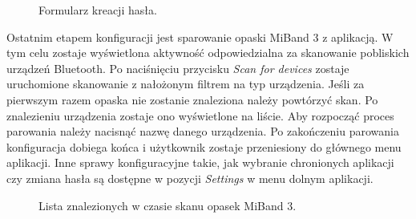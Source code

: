 \begin{figure}[H]
    \begin{center}
        \setlength{\fboxsep}{0pt}%
        \setlength{\fboxrule}{0.27pt}%
    \end{center}
    \caption{{\color{dgray}Formularz kreacji hasła.}} \label{setPassword}
\end{figure}
Ostatnim etapem konfiguracji jest sparowanie opaski MiBand 3 z aplikacją. W tym celu zostaje wyświetlona aktywność odpowiedzialna za skanowanie pobliskich urządzeń Bluetooth. Po naciśnięciu przycisku \textit{Scan for devices} zostaje uruchomione skanowanie z nałożonym filtrem na typ urządzenia. Jeśli za pierwszym razem opaska nie zostanie znaleziona należy powtórzyć skan. Po znalezieniu urządzenia zostaje ono wyświetlone na liście. Aby rozpocząć proces parowania należy nacisnąć nazwę danego urządzenia. Po zakończeniu parowania konfiguracja dobiega końca i użytkownik zostaje przeniesiony do głównego menu aplikacji. Inne sprawy konfiguracyjne takie, jak wybranie chronionych aplikacji czy zmiana hasła są dostępne w pozycji \textit{Settings} w menu dolnym aplikacji.
\begin{figure}[H]
    \begin{center}
        \setlength{\fboxsep}{0pt}%
        \setlength{\fboxrule}{0.27pt}%
    \end{center}
    \caption{{\color{dgray}Lista znalezionych w czasie skanu opasek MiBand 3.}} \label{afterScan}
\end{figure}
